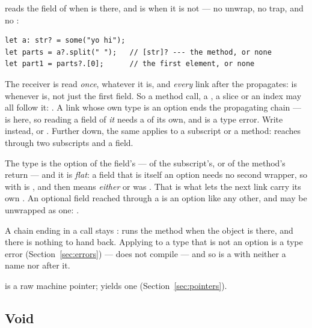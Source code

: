  reads the field  of  when  is there, and is
 when it is not --- no unwrap, no trap, and no \ic{!}:
\begin{lstlisting}
let a: str? = some("yo hi");
let parts = a?.split(" ");   // [str]? --- the method, or none
let part1 = parts?.[0];      // the first element, or none
\end{lstlisting}
The receiver is read \emph{once}, whatever it is, and \emph{every} link
after the  propagates:  is
 whenever  is, not just the first field. So a method
call, a , a slice or an index may all follow it:
. A link whose own type is an option ends the
propagating chain ---  is  here, so reading a field
of \emph{it} needs a  of its own, and 
is a type error. Write 
instead, or . Further down, the same applies
to a subscript or a method:  reaches through two
subscripts and a field.

The type is the option of the field's --- of the subscript's, or of the
method's return --- and it is \emph{flat}: a field that is itself an
option needs no second wrapper, so  with  is ,
and  then means \emph{either}  or  was .
That is what lets the next link carry its own . An optional field
reached through a  is an option like any other, and may be
unwrapped as one: .

A chain ending in a  call stays : 
runs the method when the object is there, and there is nothing to hand
back. Applying  to a type that is not an option is a type error
(Section~\ref{sec:errors}) ---  does not compile --- and so is
a  with neither a name nor \ic{[} after it.

 is a raw machine pointer;  yields one
(Section~\ref{sec:pointers}).

\subsection{Void}

